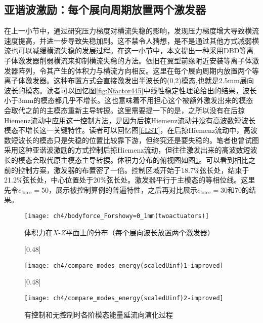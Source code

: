 \subsection{亚谐波激励：每个展向周期放置两个激发器}\label{subs:control2}
在上一小节中，通过研究压力梯度对横流失稳的影响，发现压力梯度增大导致横流速度提高，并进一步导致失稳加剧。这不禁令人猜想，是不是通过其他方式减弱横流也可以减缓横流失稳的发展过程。在这一小节中，本文提出一种采用DBD等离子体激发器削弱横流来抑制横流失稳的方法。依旧在翼型前缘附近安装等离子体激发器阵列，令其产生的体积力与横流方向相反。这里在每个展向周期内放置两个等离子体激发器。这种布置方式会直接激发出半波长的(0,2)模态,也就是2.5mm展向波长的模态。读者可以回忆图\ref{fig:Nfactor445}中线性稳定性理论给出的结果，波长小于3mm的模态都几乎不增长。这也意味着不用担心这个被额外激发出来的模态会取代之前的主模态重新主导转捩。这里需要提一下的是，之所以没有在后掠Hiemenz流动中应用这一控制方法，是因为后掠Hiemenz流动并没有高波数短波长模态不增长这一关键特性。读者可以回忆图\ref{f:LST}，在后掠Hiemenz流动中，高波数短波长的模态只是失稳的位置比较靠下游，但终究还是要失稳的。笔者也曾试图采用这种亚谐波激励的方式控制后掠Hiemenz流动，但往往激发出来的高波数短波长的模态会取代原主模态主导转捩。体积力分布的俯视图如图\ref{f:force2perwavelength}。可以看到相比之前的控制方案，激发器的布置密了一倍。控制区域开始于18.7\%弦长处，结束于21.2\%弦长处，中心位置处于20\%弦长处。激发器平行于主模态的等相位线。这里先令$c_\mathrm{force}=50$，展示被控制算例的普遍特性，之后再对比展示$c_\mathrm{force}=30$和70的结果。
\begin{figure}[htb]
\centering
  \texttt{[image: ch4/bodyforce\_Forshowy=0\_1mm(twoactuators)]}
  \caption{体积力在$X$-$Z$平面上的分布（每个展向波长放置两个激发器）}%
  \label{f:force2perwavelength}
\end{figure}
\begin{figure}[htb]
\centering
  \subcaptionbox{\label{f:basecase_a}}[0.48\textwidth]{

    \texttt{[image: ch4/compare\_modes\_energy(scaledUinf)1-improved]}}
  \subcaptionbox{\label{f:basecase_b}}[0.48\textwidth]{

    \texttt{[image: ch4/compare\_modes\_energy(scaledUinf)2-improved]}}
  \caption{有控制和无控制时各阶模态能量延流向演化过程}%
  \label{f:basecase}
\end{figure}


